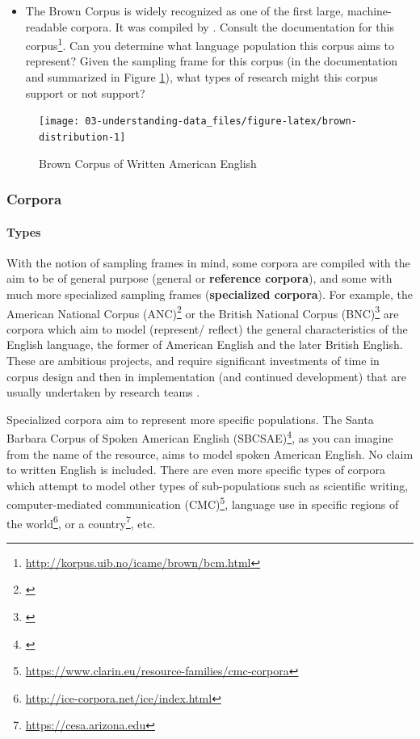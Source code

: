 \documentclass[
]{article}
\DeclareRobustCommand{\href}[2]{#2\footnote{\url{#1}}}
\newenvironment{rmdblock}[1]
  {\begin{shaded*}
  \begin{itemize}
  \renewcommand{\labelitemi}{
    \raisebox{-.5\height}[0pt][0pt]{
      {\setkeys{Gin}{width=2em,keepaspectratio}\texttt{[image: assets/images/\#1]}}
    }
  }
  \item
  }
  {
  \end{itemize}
  \end{shaded*}
  }
\newenvironment{rmdnote}
  {\begin{rmdblock}{note}}
  {\end{rmdblock}}
\begin{document}
\begin{rmdnote}
The Brown Corpus is widely recognized as one of the first large, machine-readable corpora. It was compiled by \citet{Kucera1967}. Consult the \href{http://korpus.uib.no/icame/brown/bcm.html}{documentation for this corpus}. Can you determine what language population this corpus aims to represent? Given the sampling frame for this corpus (in the documentation and summarized in Figure \ref{fig:brown-distribution}), what types of research might this corpus support or not support?
\end{rmdnote}

\begin{figure}

{\centering \texttt{[image: 03-understanding-data\_files/figure-latex/brown-distribution-1]} 

}

\caption{Brown Corpus of Written American English}\label{fig:brown-distribution}
\end{figure}

\hypertarget{corpora}{%
\subsubsection{Corpora}\label{corpora}}

\hypertarget{types}{%
\paragraph{Types}\label{types}}

With the notion of sampling frames in mind, some corpora are compiled with the aim to be of general purpose (general or \textbf{reference corpora}), and some with much more specialized sampling frames (\textbf{specialized corpora}). For example, the \href{}{American National Corpus (ANC)} or the \href{}{British National Corpus (BNC)} are corpora which aim to model (represent/ reflect) the general characteristics of the English language, the former of American English and the later British English. These are ambitious projects, and require significant investments of time in corpus design and then in implementation (and continued development) that are usually undertaken by research teams \citep{Adel2020}.

Specialized corpora aim to represent more specific populations. The \href{}{Santa Barbara Corpus of Spoken American English (SBCSAE)}, as you can imagine from the name of the resource, aims to model spoken American English. No claim to written English is included. There are even more specific types of corpora which attempt to model other types of sub-populations such as scientific writing, \href{https://www.clarin.eu/resource-families/cmc-corpora}{computer-mediated communication (CMC)}, language use in specific \href{http://ice-corpora.net/ice/index.html}{regions of the world}, or \href{https://cesa.arizona.edu}{a country}, etc.
\end{document}
